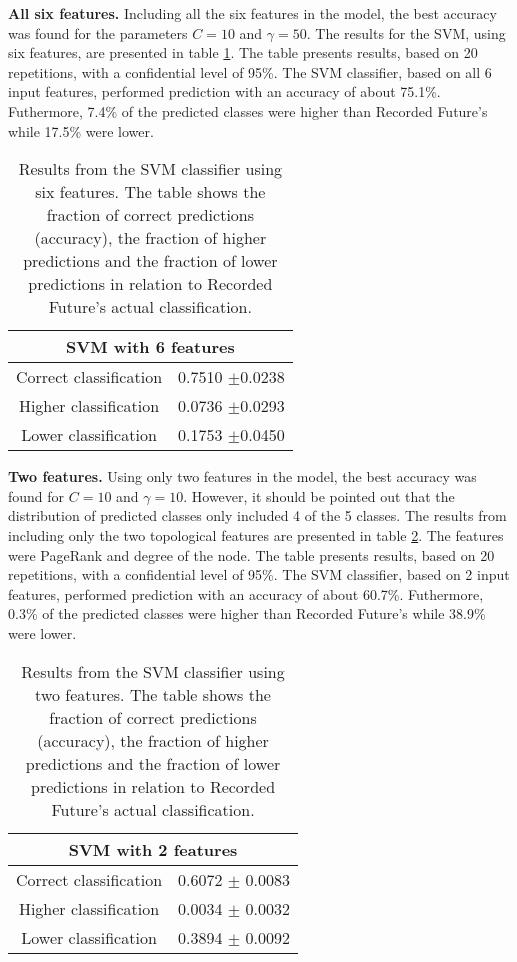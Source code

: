 \textbf{All six features.} Including all the six features in the model, the best accuracy was found for the parameters $C=10$ and $\gamma=50$. The results for the SVM, using six features, are presented in table \ref{IpRes}. The table presents results, based on 20 repetitions, with a confidential level of 95\%. The SVM classifier, based on all 6 input features, performed prediction with an accuracy of about 75.1\%. Futhermore, 7.4\% of the predicted classes were higher than Recorded Future's while 17.5\% were lower. 

\begin{table}[h!]
    \centering
    \caption{Results from the SVM classifier using six features. The table shows the fraction of correct predictions (accuracy), the fraction of higher predictions and the fraction of lower predictions in relation to Recorded Future's actual classification.}
    \begin{tabular}{|c|c|}
    \hline
        \multicolumn{2}{|c|}{SVM with 6 features}\\ \hline
        Correct classification  & 0.7510 $\pm$0.0238 \\
        Higher classification   & 0.0736 $\pm$0.0293 \\
        Lower classification    & 0.1753 $\pm$0.0450 \\ \hline
    \end{tabular}
    \label{IpRes}
\end{table}



\textbf{Two features.} Using only two features in the model, the best accuracy was found for $C=10$ and $\gamma=10$. However, it should be pointed out that the distribution of predicted classes only included 4 of the 5 classes. The results from including only the two topological features are presented in table \ref{IpRes2Feat}. The features were PageRank and degree of the node. The table presents results, based on 20 repetitions, with a confidential level of 95\%. The SVM classifier, based on 2 input features, performed prediction with an accuracy of about 60.7\%. Futhermore, 0.3\% of the predicted classes were higher than Recorded Future's while 38.9\% were lower. 

\begin{table}[h!]
    \centering
    \caption{Results from the SVM classifier using two features. The table shows the fraction of correct predictions (accuracy), the fraction of higher predictions and the fraction of lower predictions in relation to Recorded Future's actual classification.}
    \begin{tabular}{|c|c|}
    \hline
        \multicolumn{2}{|c|}{SVM with 2 features}\\ \hline
        Correct classification  & 0.6072 $\pm$ 0.0083 \\
        Higher classification   & 0.0034 $\pm$ 0.0032 \\
        Lower classification    & 0.3894 $\pm$ 0.0092 \\ \hline
    \end{tabular}
    \label{IpRes2Feat}
\end{table}

